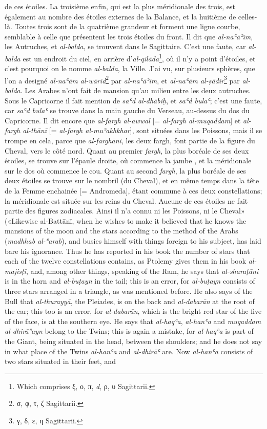 \documentclass[11pt]{article}
\begin{document}
de ces étoiles. La troisième enfin, qui est la plus méridionale des trois, est également au nombre des étoiles externes de la Balance, et la huitième de celles-là. Toutes trois sont de la quatrième grandeur et forment une ligne courbe, semblable à celle que présentent les trois étoiles du front. Il dit que \emph{al-naʿāʾim}, les Autruches, et \emph{al-balda}, se trouvent dans le Sagittaire. C’est une faute, car \emph{al-balda} est un endroit du ciel, en arrière d’\emph{al-qilāda}\footnote{Which comprises {\greekfont ξ, ο, π}, \emph{d}, {\greekfont ρ, υ} Sagittarii.}, où il n’y a point d’étoiles, et c’est pourquoi on le nomme \emph{al-balda}, la Ville. J’ai vu, sur plusieurs sphères, que l’on a designé \emph{al-naʿām al-wārid}\footnote{{\greekfont σ, φ, τ, ζ} Sagittarii.} par \emph{al-naʿāʾim}, et \emph{al-naʿām al-ṣādir}\footnote{{\greekfont γ, δ, ε, η} Sagittarii.} par \emph{al-balda}. Les Arabes n’ont fait de mansion qu’au milieu entre les deux autruches. Sous le Capricorne il fait mention de \emph{saʿd al-dhābiḥ}, et \emph{saʿd bulaʿ}; c’est une faute, car \emph{saʿd bulaʿ} se trouve dans la main gauche du Verseau, au-dessus du dos du Capricorne. Il dit encore que \emph{al-fargh al-awwal} [= \emph{al-fargh al-muqaddam}] et \emph{al-fargh al-thānī} [= \emph{al-fargh al-muʾakhkhar}], sont situées dans les Poissons, mais il se trompe en cela, parce que \emph{al-farghāni}, les deux fargh, font partie de la figure du Cheval, vers le côté nord. Quant au premier \emph{fargh}, la plus boréale de ses deux étoiles, se trouve sur l’épaule droite, où commence la jambe , et la méridionale sur le dos où commence le cou. Quant au second \emph{fargh}, la plus boréale de ses deux étoiles se trouve sur le nombril (du Cheval), et en même temps dans la tête de la Femme enchainée [= Andromeda], étant commune à ces deux constellations; la méridionale est située sur les reins  du Cheval. Aucune de ces étoiles ne fait partie des figures zodiacales. Ainsi il n’a connu ni les Poissons, ni le Cheval» («Likewise al-Battānī, when he wishes to make it believed that he knows the mansions of the moon and the stars according to the method of the Arabs (\emph{madhhab al-ʿarab}), and busies himself with things foreign to his subject, has laid bare his ignorance. Thus he has reported in his book the number of stars that each of the twelve constellations contains, as Ptolemy gives them in his book \emph{al-majisṭī}, and, among other things, speaking of the Ram, he says that \emph{al-sharaṭāni} is in the horn and \emph{al-buṭayn} in the tail; this is an error, for \emph{al-buṭayn} consists of three stars arranged in a triangle, as was mentioned before. He also says of the Bull that \emph{al-thurayyā}, the Pleiades, is on the back and \emph{al-dabarān} at the root of the ear; this too is an error, for \emph{al-dabarān}, which is the bright red star of the five of the face, is at the southern eye. He says that \emph{al-haqʿa}, \emph{al-hanʿa} and \emph{muqaddam al-dhirāʿayn} belong to the Twins; this is again a mistake, for \emph{al-haqʿa} is part of the Giant, being situated in the head, between the shoulders; and he does not say in what place of the Twins \emph{al-hanʿa} and \emph{al-dhirāʿ} are. Now \emph{al-hanʿa} consists of two stars situated in their feet, and 
\end{document}
